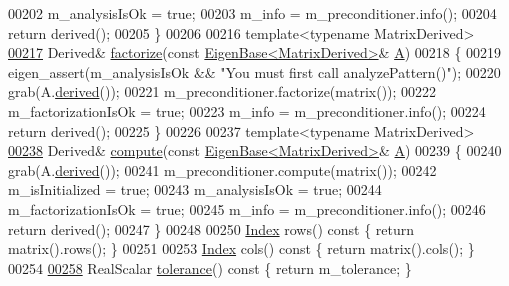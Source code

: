 \begin{DoxyCode}
00202     m\_analysisIsOk = \textcolor{keyword}{true};
00203     m\_info = m\_preconditioner.info();
00204     \textcolor{keywordflow}{return} derived();
00205   \}
00206   
00216   \textcolor{keyword}{template}<\textcolor{keyword}{typename} MatrixDerived>
\hyperlink{group___iterative_linear_solvers___module_a1374b141721629983cd8276b4b87fc58}{00217}   Derived& \hyperlink{group___iterative_linear_solvers___module_a1374b141721629983cd8276b4b87fc58}{factorize}(\textcolor{keyword}{const} \hyperlink{group___core___module_struct_eigen_1_1_eigen_base}{EigenBase<MatrixDerived>}& 
      \hyperlink{group___core___module_class_eigen_1_1_matrix}{A})
00218   \{
00219     eigen\_assert(m\_analysisIsOk && \textcolor{stringliteral}{"You must first call analyzePattern()"}); 
00220     grab(A.\hyperlink{group___core___module_a324b16961a11d2ecfd2d1b7dd7946545}{derived}());
00221     m\_preconditioner.factorize(matrix());
00222     m\_factorizationIsOk = \textcolor{keyword}{true};
00223     m\_info = m\_preconditioner.info();
00224     \textcolor{keywordflow}{return} derived();
00225   \}
00226 
00237   \textcolor{keyword}{template}<\textcolor{keyword}{typename} MatrixDerived>
\hyperlink{group___iterative_linear_solvers___module_a7dfa55c55e82d697bde227696a630914}{00238}   Derived& \hyperlink{group___iterative_linear_solvers___module_a7dfa55c55e82d697bde227696a630914}{compute}(\textcolor{keyword}{const} \hyperlink{group___core___module_struct_eigen_1_1_eigen_base}{EigenBase<MatrixDerived>}& 
      \hyperlink{group___core___module_class_eigen_1_1_matrix}{A})
00239   \{
00240     grab(A.\hyperlink{group___core___module_a324b16961a11d2ecfd2d1b7dd7946545}{derived}());
00241     m\_preconditioner.compute(matrix());
00242     m\_isInitialized = \textcolor{keyword}{true};
00243     m\_analysisIsOk = \textcolor{keyword}{true};
00244     m\_factorizationIsOk = \textcolor{keyword}{true};
00245     m\_info = m\_preconditioner.info();
00246     \textcolor{keywordflow}{return} derived();
00247   \}
00248 
00250   \hyperlink{namespace_eigen_a62e77e0933482dafde8fe197d9a2cfde}{Index} rows()\textcolor{keyword}{ const }\{ \textcolor{keywordflow}{return} matrix().rows(); \}
00251 
00253   \hyperlink{namespace_eigen_a62e77e0933482dafde8fe197d9a2cfde}{Index} cols()\textcolor{keyword}{ const }\{ \textcolor{keywordflow}{return} matrix().cols(); \}
00254 
\hyperlink{group___iterative_linear_solvers___module_acb442c19b5858d6b9be813dd7d36cc62}{00258}   RealScalar \hyperlink{group___iterative_linear_solvers___module_acb442c19b5858d6b9be813dd7d36cc62}{tolerance}()\textcolor{keyword}{ const }\{ \textcolor{keywordflow}{return} m\_tolerance; \}

\end{DoxyCode}
